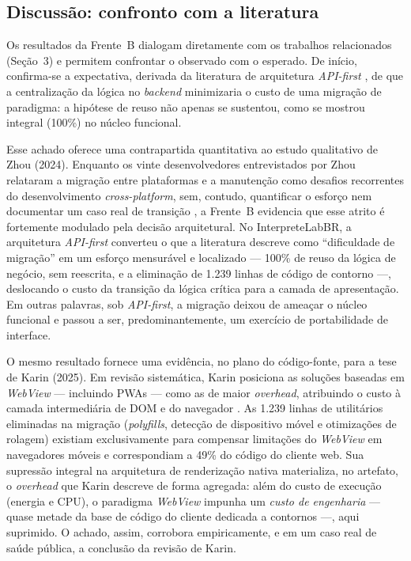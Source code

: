 \documentclass[12pt]{article}
\begin{document}
\subsection{Discussão: confronto com a literatura}
\label{sub:discussao}

Os resultados da Frente~B dialogam diretamente com os trabalhos relacionados
(Seção~3) e permitem confrontar o observado com o esperado. De início, confirma-se
a expectativa, derivada da literatura de arquitetura \emph{API-first}
\cite{rampinelli2026}, de que a centralização da lógica no \emph{backend}
minimizaria o custo de uma migração de paradigma: a hipótese de reuso não apenas se
sustentou, como se mostrou integral (100\%) no núcleo funcional.

Esse achado oferece uma contrapartida quantitativa ao estudo qualitativo de Zhou
(2024). Enquanto os vinte desenvolvedores entrevistados por Zhou relataram a
migração entre plataformas e a manutenção como desafios recorrentes do
desenvolvimento \emph{cross-platform}, sem, contudo, quantificar o esforço nem
documentar um caso real de transição \cite{zhou2024}, a Frente~B evidencia que esse
atrito é fortemente modulado pela decisão arquitetural. No InterpreteLabBR, a
arquitetura \emph{API-first} converteu o que a literatura descreve como
``dificuldade de migração'' em um esforço mensurável e localizado --- 100\% de
reuso da lógica de negócio, sem reescrita, e a eliminação de 1.239 linhas de
código de contorno ---, deslocando o custo da transição da lógica crítica para a
camada de apresentação. Em outras palavras, sob \emph{API-first}, a migração
deixou de ameaçar o núcleo funcional e passou a ser, predominantemente, um
exercício de portabilidade de interface.

O mesmo resultado fornece uma evidência, no plano do código-fonte, para a tese de
Karin (2025). Em revisão sistemática, Karin posiciona as soluções baseadas em
\emph{WebView} --- incluindo PWAs --- como as de maior \emph{overhead}, atribuindo
o custo à camada intermediária de DOM e do navegador \cite{karin2025}. As 1.239
linhas de utilitários eliminadas na migração (\emph{polyfills}, detecção de
dispositivo móvel e otimizações de rolagem) existiam exclusivamente para compensar
limitações do \emph{WebView} em navegadores móveis e correspondiam a 49\% do código
do cliente web. Sua supressão integral na arquitetura de renderização nativa
materializa, no artefato, o \emph{overhead} que Karin descreve de forma agregada:
além do custo de execução (energia e CPU), o paradigma \emph{WebView} impunha um
\emph{custo de engenharia} --- quase metade da base de código do cliente dedicada a
contornos ---, aqui suprimido. O achado, assim, corrobora empiricamente, e em um
caso real de saúde pública, a conclusão da revisão de Karin.
\end{document}
